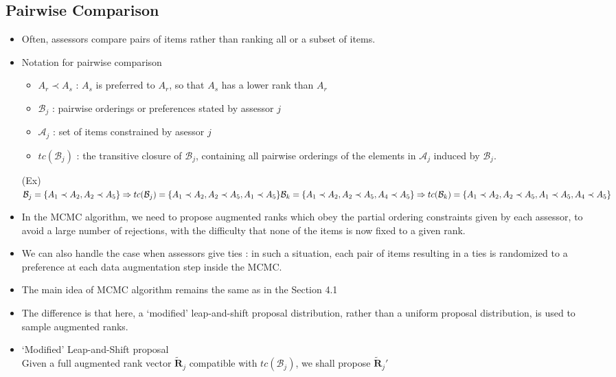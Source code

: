 \documentclass[12pt]{article}
\begin{document}
\subsection{Pairwise Comparison}
\begin{itemize}
    \item Often, assessors compare pairs of items rather than ranking all or a subset of items. 
    \item Notation for pairwise comparison 
    \begin{itemize}
        \item $A_r\prec A_s$ : $A_s$ is preferred to $A_r$, so that $A_s$ has a lower rank than $A_r$ 
        \item $\mathcal{B}_j$ : pairwise orderings or preferences stated by assessor $j$
        \item $\mathcal{A}_j$ : set of items constrained by asessor $j$
        \item $tc(\mathcal{B}_j)$ : the transitive closure of $\mathcal{B}_j$, containing all pairwise orderings of the elements in $\mathcal{A}_j$ induced by $\mathcal{B}_j$.
    \end{itemize} 
    \item[(Ex)] $\mathcal{B}_j=\{A_1\prec A_2, A_2\prec A_5\} \Rightarrow tc(\mathcal{B}_j)=\{A_1\prec A_2, A_2\prec A_5, A_1\prec A_5\} \\ \mathcal{B}_k=\{A_1\prec A_2, A_2\prec A_5, A_4\prec A_5\} \Rightarrow tc(\mathcal{B}_k)=\{A_1\prec A_2, A_2\prec A_5, A_1\prec A_5, A_4\prec A_5\}$
    \item In the MCMC algorithm, we need to propose augmented ranks which obey the partial ordering constraints given by each assessor, to avoid a large number of rejections, with the difficulty that none of the items is now fixed to a given rank.
    \item We can also handle the case when assessors give ties : in such a situation, each pair of items resulting in a ties is randomized to a preference at each data augmentation step inside the MCMC.
    \item The main idea of MCMC algorithm remains the same as in the Section 4.1
    \item The difference is that here, a `modified' leap-and-shift proposal distribution, rather than a uniform proposal distribution, is used to sample augmented ranks.
    \item `Modified' Leap-and-Shift proposal \\ Given a full augmented rank vector $\tilde{\mathbf{R}}_j$ compatible with $tc(\mathcal{B}_j)$, we shall propose $\tilde{\mathbf{R}}_j'$

\end{itemize}
\end{document}
